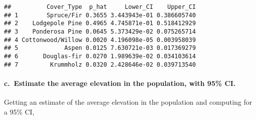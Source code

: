 \documentclass[12pt]{article}
\newenvironment{Shaded}{\begin{snugshade}}{\end{snugshade}}
\newcommand{\DecValTok}[1]{\textcolor[rgb]{0.00,0.00,0.81}{#1}}
\newcommand{\FloatTok}[1]{\textcolor[rgb]{0.00,0.00,0.81}{#1}}
\newcommand{\FunctionTok}[1]{\textcolor[rgb]{0.13,0.29,0.53}{\textbf{#1}}}
\newcommand{\NormalTok}[1]{#1}
\newcommand{\OtherTok}[1]{\textcolor[rgb]{0.56,0.35,0.01}{#1}}
\newcommand{\SpecialCharTok}[1]{\textcolor[rgb]{0.81,0.36,0.00}{\textbf{#1}}}
\begin{document}
\begin{Shaded}
\end{Shaded}

\begin{verbatim}
##          Cover_Type  p_hat     Lower_CI    Upper_CI
## 1        Spruce/Fir 0.3655 3.443943e-01 0.386605740
## 2    Lodgepole Pine 0.4965 4.745871e-01 0.518412929
## 3    Ponderosa Pine 0.0645 5.373429e-02 0.075265714
## 4 Cottonwood/Willow 0.0020 4.196098e-05 0.003958039
## 5             Aspen 0.0125 7.630721e-03 0.017369279
## 6       Douglas-fir 0.0270 1.989639e-02 0.034103614
## 7         Krummholz 0.0320 2.428646e-02 0.039713540
\end{verbatim}

\paragraph{c.~Estimate the average elevation in the population, with
95\%
CI.}\label{c.-estimate-the-average-elevation-in-the-population-with-95-ci.}

\hspace{0.5cm}

Getting an estimate of the average elevation in the population and
computing for a 95\% CI,
\end{document}
